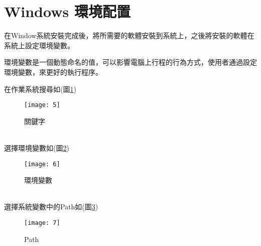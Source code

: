 \section{Windows 環境配置}
\par
\renewcommand{\baselinestretch}{1} %
\twelve \qquad 在Window系統安裝完成後，將所需要的軟體安裝到系統上，之後將安裝的軟體在系統上設定環境變數。
\\
\par
\renewcommand{\baselinestretch}{1} %
\twelve \hspace{0.5em} 環境變數是一個動態命名的值，可以影響電腦上行程的行為方式，使用者通過設定環境變數，來更好的執行程序。
\\
\par
\renewcommand{\baselinestretch}{1} %
\twelve \hspace{0.5em} 在作業系統搜尋如(圖\ref{fig.關鍵字})
\\
\par
\renewcommand{\baselinestretch}{1.7} %
\begin{figure}[hbt!]
\begin{center}
\texttt{[image: 5]}
\caption{\large 關鍵字}\label{fig.關鍵字}
\end{center}
\end{figure}
\par
\\
\renewcommand{\baselinestretch}{1} %
\twelve \hspace{0.5em} 選擇環境變數如(圖\ref{fig.環境變數})
\\
\par
\renewcommand{\baselinestretch}{1.7} %
\begin{figure}[hbt!]
\begin{center}
\texttt{[image: 6]}
\caption{\large 環境變數}\label{fig.環境變數}
\end{center}
\end{figure}
\par
\\
\renewcommand{\baselinestretch}{1} %
\twelve \hspace{0.5em} 選擇系統變數中的Path如(圖\ref{fig.Path})
\\
\par
\renewcommand{\baselinestretch}{1.7} %
\begin{figure}[hbt!]
\begin{center}
\texttt{[image: 7]}
\caption{\large Path}\label{fig.Path}
\end{center}
\end{figure}
